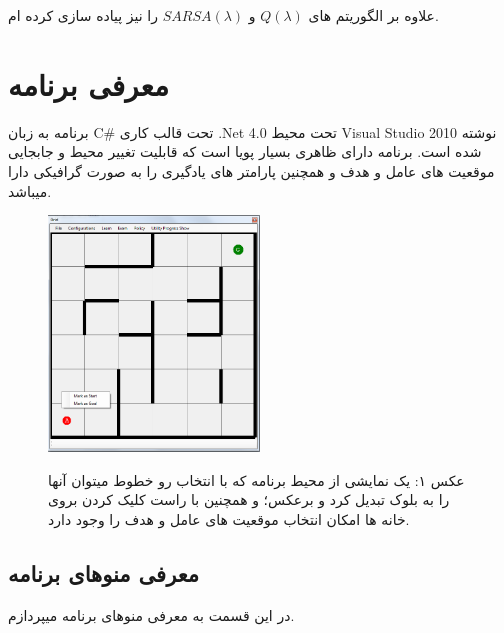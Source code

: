 \documentclass[10pt,a4paper]{article}
\begin{document}
\begin{Arabic}
علاوه بر الگوریتم های
\textenglish{$Q(\lambda)$} و \textenglish{$SARSA(\lambda)$}
را نیز پیاده سازی کرده ام.
\section{\textarabic{معرفی برنامه}}
برنامه به زبان
\textenglish{C\#}
تحت قالب کاری
\textenglish{.Net 4.0}
تحت محیط
\textenglish{Visual Studio 2010}
نوشته شده است.
  برنامه دارای ظاهری بسیار پویا است که قابلیت تغییر محیط و جابجایی موقعیت های عامل و هدف و همچنین پارامتر 
  های یادگیری را به صورت گرافیکی دارا میباشد.
\begin{figure}[H]
    \centering
    \includegraphics[width=0.5\textwidth]{init}
    \begin{center}\textarabic{
    عکس ۱: یک نمایشی از محیط برنامه که با انتخاب رو خطوط میتوان آنها را به بلوک تبدیل کرد و برعکس؛ و همچنین با راست کلیک کردن بروی خانه ها امکان انتخاب موقعیت های عامل و هدف را وجود دارد.}
    \end{center}
\end{figure}
    \subsection{\textarabic{معرفی منوهای برنامه}}
    در این قسمت به معرفی منوهای برنامه میپردازم.

\end{Arabic}
\end{document}
